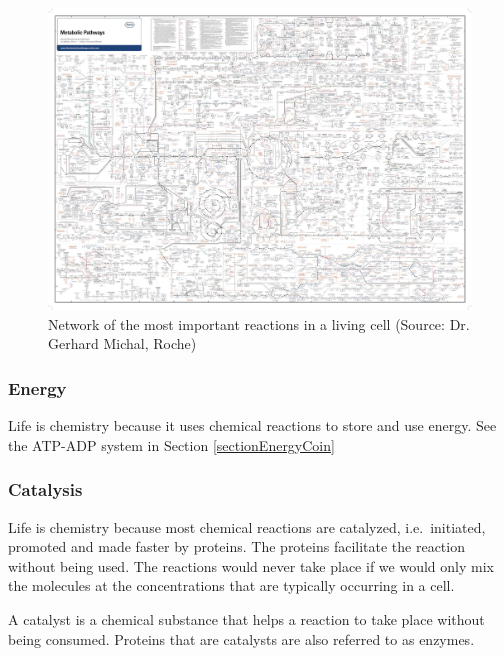 \documentclass[
  11pt,
]{book}
\begin{document}
\begin{figure}

{\centering \includegraphics[width=1\linewidth]{./figs/roche_pathways} 

}

\caption{Network of the most important reactions in a living cell (Source: Dr. Gerhard Michal, Roche)}\label{fig:chemicalReactionsCell}
\end{figure}

\hypertarget{energy}{%
\subsubsection{Energy}\label{energy}}

Life is chemistry because it uses chemical reactions to store and use energy. See the ATP-ADP system in Section \ref{sectionEnergyCoin}

\hypertarget{catalysis}{%
\subsubsection{Catalysis}\label{catalysis}}

Life is chemistry because most chemical reactions are catalyzed, i.e.~initiated, promoted and made faster by proteins. The proteins facilitate the reaction without being used. The reactions would never take place if we would only mix the molecules at the concentrations that are typically occurring in a cell.

A catalyst is a chemical substance that helps a reaction to take place without being consumed. Proteins that are catalysts are also referred to as enzymes.
\end{document}
